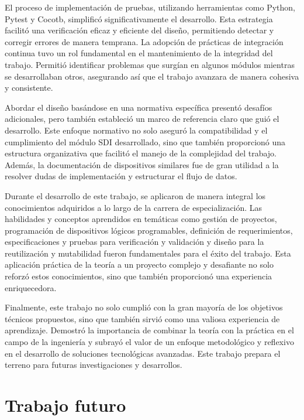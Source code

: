 El proceso de implementación de pruebas, utilizando herramientas como Python,
Pytest y Cocotb, simplificó significativamente el desarrollo. Esta estrategia
facilitó una verificación eficaz y eficiente del diseño, permitiendo detectar
y corregir errores de manera temprana. La adopción de prácticas de integración
continua tuvo un rol fundamental en el mantenimiento de la integridad del
trabajo. Permitió identificar problemas que surgían en algunos módulos mientras
se desarrollaban otros, asegurando así que el trabajo avanzara de manera
cohesiva y consistente.

Abordar el diseño basándose en una normativa específica presentó desafíos
adicionales, pero también estableció un marco de referencia claro que guió el
desarrollo. Este enfoque normativo no solo aseguró la compatibilidad y el
cumplimiento del módulo SDI desarrollado, sino que también proporcionó una
estructura organizativa que facilitó el manejo de la complejidad del trabajo.
Además, la documentación de dispositivos similares fue de gran utilidad a la
resolver dudas de implementación y estructurar el flujo de datos.

Durante el desarrollo de este trabajo, se aplicaron de manera integral los
conocimientos adquiridos a lo largo de la carrera de especialización. Las
habilidades y conceptos aprendidos en temáticas como gestión de proyectos,
programación de dispositivos lógicos programables, definición de
requerimientos, especificaciones y pruebas para verificación y validación y
diseño para la reutilización y mutabilidad fueron fundamentales para el éxito
del trabajo. Esta aplicación práctica de la teoría a un proyecto complejo y
desafiante no solo reforzó estos conocimientos, sino que también proporcionó
una experiencia enriquecedora.

Finalmente, este trabajo no solo cumplió con la gran mayoría de los objetivos
técnicos propuestos, sino que también sirvió como una valiosa experiencia de
aprendizaje. Demostró la importancia de combinar la teoría con la práctica en
el campo de la ingeniería y subrayó el valor de un enfoque metodológico y
reflexivo en el desarrollo de soluciones tecnológicas avanzadas. Este trabajo
prepara el terreno para futuras investigaciones y desarrollos.

\section{Trabajo futuro}


